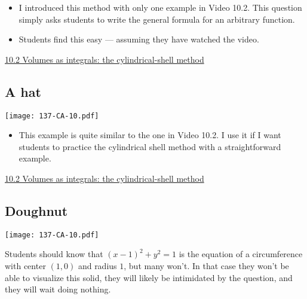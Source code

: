 \documentclass[11pt]{article}
\newcommand {\DS} [1] {${\displaystyle #1}$}
\newcommand{\nl}{\hfill \vspace{-1.1\baselineskip}} %
\newcommand{\vii}{\hspace{8mm}\href{https://www.youtube.com/watch?v=YYM9URJ4iJ8&list=PLlwePzQY_wW9f22c89JAQBzaa-9XgESA8&index=2}{10.2 Volumes as integrals: the cylindrical-shell method}}
\begin{document}
\begin{comments}
\nl
	\begin{itemize}
		\item  I introduced this method with only one example in Video 10.2.  This question simply asks students to write the general formula for an arbitrary function.
		\item Students find this easy --- assuming they have watched the video.
	\end{itemize}
\end{comments}

\begin{videos}
\vii
\end{videos}

\newpage
\subsection{A hat}

\begin{center}
{ \texttt{[image: 137-CA-10.pdf]}} 
\end{center}

\begin{comments}
\nl
	\begin{itemize}
		\item This example is quite similar to the one in Video 10.2.  I use it if I want students to practice the cylindrical shell method with a straightforward example.
	\end{itemize}
\end{comments}

\begin{videos}
\vii
\end{videos}

\newpage
\subsection{Doughnut}

\begin{center}
{ \texttt{[image: 137-CA-10.pdf]}} 
\end{center}

\begin{warning}
	Students should know that \DS{(x-1)^2 + y^2 = 1} is the equation of a circumference with center $(1,0)$ and radius $1$, but many won't.   In that case they won't be able to visualize this solid, they will likely be intimidated by the question, and they will wait doing nothing.
\end{warning}
\end{document}
